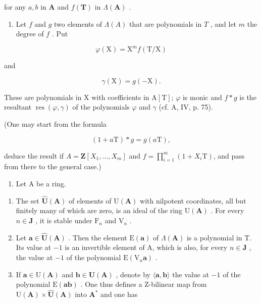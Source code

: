 for any \(a, b\) in \(\mathbf{A}\) and \(f(\mathbf{T})\) in \(\Lambda(\mathbf{A})\) .

\begin{enumerate}
\def\labelenumi{\alph{enumi})}
\setcounter{enumi}{4}
\tightlist
\item
  Let \(f\) and \(g\) two elements of \(\Lambda(A)\) that are polynomials in \(T\) , and let \(m\) the degree of \(f\) . Put
\end{enumerate}

\[
\varphi (\mathrm{X}) = \mathrm{X} ^ {m} f (\mathrm{T} / \mathrm{X})
\]

and

\[
\gamma (\mathrm{X}) = g (- \mathrm{X}).
\]

These are polynomials in X with coefficients in A\([\mathrm{T}]\); \(\varphi\) is monic and \(f*g\) is the resultant \(\operatorname{res}(\varphi, \gamma)\) of the polynomials \(\varphi\) and \(\gamma\) (cf. A, IV, p. 75).

(One may start from the formula

\[
(1 + a \mathrm{T}) * g = g (a \mathrm{T}),
\]

deduce the result if \(A = \mathbf{Z}[X_{1}, \ldots, X_{m}]\) and \(f = \prod_{i=1}^{m} (1 + X_i \mathrm{T})\), and pass from there to the general case.)

\begin{enumerate}
\def\labelenumi{\arabic{enumi})}
\setcounter{enumi}{43}
\tightlist
\item
  Let A be a ring.
\end{enumerate}

\begin{enumerate}
\def\labelenumi{\alph{enumi})}
\item
  The set \(\hat{\mathbf{U}}(\mathbf{A})\) of elements of \(\mathrm{U}(\mathbf{A})\) with nilpotent coordinates, all but finitely many of which are zero, is an ideal of the ring \(\mathrm{U}(\mathbf{A})\) . For every \(n \in \mathbf{J}\) , it is stable under \(\mathrm{F}_n\) and \(\mathrm{V}_n\) .
\item
  Let \(\boldsymbol{a} \in \hat{\mathbf{U}}(\mathbf{A})\) . Then the element \(\mathrm{E}(\boldsymbol{a})\) of \(\Lambda(\mathbf{A})\) is a polynomial in T. Its value at \(-1\) is an invertible element of A, which is also, for every \(n \in \mathbf{J}\) , the value at \(-1\) of the polynomial \(\mathrm{E}(\mathrm{V}_n\boldsymbol{a})\) .
\item
  If \(\boldsymbol{a} \in \mathrm{U}(\mathbf{A})\) and \(\boldsymbol{b} \in \hat{\mathbf{U}}(\mathbf{A})\) , denote by \(\langle \boldsymbol{a}, \boldsymbol{b} \rangle\) the value at \(-1\) of the polynomial \(\mathrm{E}(\boldsymbol{a}\boldsymbol{b})\) . One thus defines a Z-bilinear map from \(\mathrm{U}(\mathbf{A}) \times \hat{\mathbf{U}}(\mathbf{A})\) into \(\mathbf{A}^*\) and one has
\end{enumerate}


